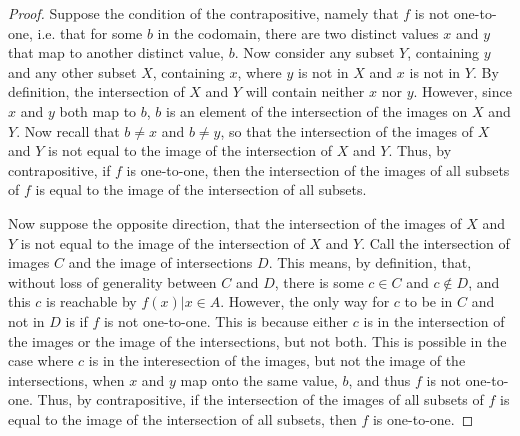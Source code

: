 \begin{proof}
Suppose the condition of the contrapositive, namely that $f$ is not one-to-one, i.e. that for some $b$ in the codomain, there are two distinct values $x$ and $y$ that map to another distinct value, $b$.
Now consider any subset $Y$, containing $y$ and any other subset $X$, containing $x$, where $y$ is not in $X$ and $x$ is not in $Y$. 
By definition, the intersection of $X$ and $Y$ will contain neither $x$ nor $y$.
However, since $x$ and $y$ both map to $b$, $b$ is an element of the intersection of the images on $X$ and $Y$.
Now recall that $b \neq x$ and $b \neq y$, so that the intersection of the images of $X$ and $Y$ is not equal to the image of the intersection of $X$ and $Y$.
Thus, by contrapositive, if $f$ is one-to-one, then the intersection of the images of all subsets of $f$ is equal to the image of the intersection of all subsets.

Now suppose the opposite direction, that the intersection of the images of $X$ and $Y$ is not equal to the image of the intersection of $X$ and $Y$. Call the intersection of images $C$ and the image of intersections $D$.
This means, by definition, that, without loss of generality between $C$ and $D$, there is some $c \in C$ and $c \not\in D$, and this $c$ is reachable by $f(x) | x \in A$.
However, the only way for $c$ to be in $C$ and not in $D$ is if $f$ is not one-to-one.
This is because either $c$ is in the intersection of the images or the image of the intersections, but not both.
This is possible in the case where $c$ is in the interesection of the images, but not the image of the intersections, when $x$ and $y$ map onto the same value, $b$, and thus $f$ is not one-to-one.
Thus, by contrapositive, if the intersection of the images of all subsets of $f$ is equal to the image of the intersection of all subsets, then $f$ is one-to-one.
\end{proof}

